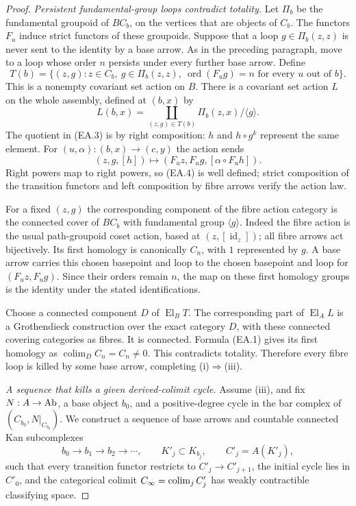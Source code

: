 \begin{proof}
\emph{Persistent fundamental-group loops contradict totality.}
Let $\Pi_b$ be the fundamental groupoid of $BC_b$, on the
vertices that are objects of $C_b$. The functors $F_u$ induce
strict functors of these groupoids. Suppose that a loop
$g\in\Pi_b(z,z)$ is never sent to the identity by a base arrow.
As in the preceding paragraph, move to a loop whose order
$n$ persists under every further base arrow. Define
\[
 T(b)=\{(z,g): z\in C_b,\ g\in\Pi_b(z,z),
       \ \operatorname{ord}(F_u g)=n
          \text{ for every }u\text{ out of }b\}.
 \tag{EA.2}
\]
This is a nonempty covariant set action on $B$.
There is a covariant set action $L$ on the whole assembly,
defined at $(b,x)$ by
\[
 L(b,x)=\coprod_{(z,g)\in T(b)}
      \Pi_b(z,x)/\langle g\rangle.
 \tag{EA.3}
\]
The quotient in (EA.3) is by right composition: $h$ and
$h\circ g^k$ represent the same element. For
$(u,\alpha):(b,x)\to(c,y)$ the action sends
\[
 (z,g,[h])\longmapsto
       (F_u z,F_u g,[\alpha\circ F_u h]).
 \tag{EA.4}
\]
Right powers map to right powers, so (EA.4) is well defined;
strict composition of the transition functors and left
composition by fibre arrows verify the action law.

For a fixed $(z,g)$ the corresponding component of the fibre
action category is the connected cover of $BC_b$ with
fundamental group $\langle g\rangle$. Indeed the fibre
action is the usual path-groupoid coset action, based at
$(z,[\operatorname{id}_z])$; all fibre arrows act bijectively.
Its first homology is canonically $C_n$, with $1$ represented
by $g$. A base arrow carries this chosen basepoint and loop
to the chosen basepoint and loop for $(F_u z,F_u g)$.
Since their orders remain $n$, the map on these first
homology groups is the identity under the stated identifications.

Choose a connected component $D$ of $\operatorname{El}_B T$.
The corresponding part of $\operatorname{El}_A L$ is a
Grothendieck construction over the exact category $D$, with
these connected covering categories as fibres. It is connected.
Formula (EA.1) gives its first homology as
$\operatorname{colim}_D C_n=C_n\ne0$. This contradicts
totality. Therefore every fibre loop is killed by some base
arrow, completing (i)$\Rightarrow$(iii).

\emph{A sequence that kills a given derived-colimit cycle.}
Assume (iii), and fix $N:A\to\mathrm{Ab}$, a base object $b_0$, and
a positive-degree cycle in the bar complex of
$(C_{b_0},N|_{C_{b_0}})$. We construct a sequence of base
arrows and countable connected Kan subcomplexes
\[
 b_0\longrightarrow b_1\longrightarrow b_2\longrightarrow\cdots,
 \qquad K'_j\subset K_{b_j},
 \qquad C'_j=A(K'_j),
 \tag{EA.5}
\]
such that every transition functor restricts to
$C'_j\to C'_{j+1}$, the initial cycle lies in $C'_0$, and
the categorical colimit $C_\infty=\operatorname*{colim}_j C'_j$ has weakly
contractible classifying space.


\end{proof}
